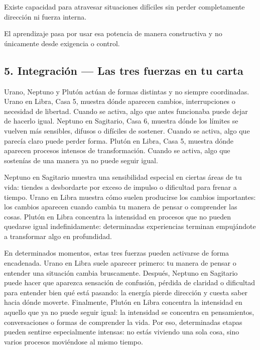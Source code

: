 \documentclass[11pt,a4paper]{article}
\begin{document}
Existe capacidad para atravesar situaciones difíciles sin perder completamente dirección ni fuerza interna.

El aprendizaje pasa por usar esa potencia de manera constructiva y no únicamente desde exigencia o control.

\vspace{0.8cm}

\subsection{5. Integración — Las tres fuerzas en tu carta}

Urano, Neptuno y Plutón actúan de formas distintas y no siempre coordinadas. Urano en Libra, Casa 5, muestra dónde aparecen cambios, interrupciones o necesidad de libertad. Cuando se activa, algo que antes funcionaba puede dejar de hacerlo igual. Neptuno en Sagitario, Casa 6, muestra dónde los límites se vuelven más sensibles, difusos o difíciles de sostener. Cuando se activa, algo que parecía claro puede perder forma. Plutón en Libra, Casa 5, muestra dónde aparecen procesos intensos de transformación. Cuando se activa, algo que sostenías de una manera ya no puede seguir igual.

Neptuno en Sagitario muestra una sensibilidad especial en ciertas áreas de tu vida: tiendes a desbordarte por exceso de impulso o dificultad para frenar a tiempo. Urano en Libra muestra cómo suelen producirse los cambios importantes: los cambios aparecen cuando cambia tu manera de pensar o comprender las cosas. Plutón en Libra concentra la intensidad en procesos que no pueden quedarse igual indefinidamente: determinadas experiencias terminan empujándote a transformar algo en profundidad.

En determinados momentos, estas tres fuerzas pueden activarse de forma encadenada. Urano en Libra suele aparecer primero: tu manera de pensar o entender una situación cambia bruscamente. Después, Neptuno en Sagitario puede hacer que aparezca sensación de confusión, pérdida de claridad o dificultad para entender bien qué está pasando: la energía pierde dirección y cuesta saber hacia dónde moverte. Finalmente, Plutón en Libra concentra la intensidad en aquello que ya no puede seguir igual: la intensidad se concentra en pensamientos, conversaciones o formas de comprender la vida. Por eso, determinadas etapas pueden sentirse especialmente intensas: no estás viviendo una sola cosa, sino varios procesos moviéndose al mismo tiempo.
\end{document}
